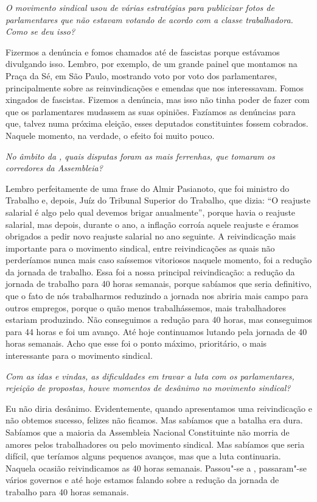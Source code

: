 \medskip

\noindent\emph{O movimento sindical usou de várias estratégias para publicizar
fotos de parlamentares que não estavam votando de acordo com a classe
trabalhadora. Como se deu isso?}

Fizermos a denúncia e fomos chamados até de
fascistas porque estávamos divulgando isso. Lembro, por exemplo, de um
grande painel que montamos na Praça da Sé, em São Paulo, mostrando voto
por voto dos parlamentares, principalmente sobre as reinvindicações e
emendas que nos interessavam. Fomos xingados de fascistas. Fizemos a
denúncia, mas isso não tinha poder de fazer com que os parlamentares
mudassem as suas opiniões. Fazíamos as denúncias para que, talvez numa
próxima eleição, esses deputados constituintes fossem cobrados. Naquele
momento, na verdade, o efeito foi muito pouco.

\medskip

\noindent\emph{No âmbito da , quais disputas foram as mais ferrenhas, que
tomaram os corredores da Assembleia?}

Lembro perfeitamente de uma frase do Almir
Pasianoto, que foi ministro do Trabalho e, depois, Juíz do Tribunal
Superior do Trabalho, que dizia: ``O reajuste salarial é algo pelo qual
devemos brigar anualmente'', porque havia o reajuste salarial, mas
depois, durante o ano, a inflação corroía aquele reajuste e éramos
obrigados a pedir novo reajuste salarial no ano seguinte. A
reivindicação mais importante para o movimento sindical, entre
reivindicações as quais não perderíamos nunca mais caso saíssemos
vitoriosos naquele momento, foi a redução da jornada de trabalho. Essa
foi a nossa principal reivindicação: a redução da jornada de trabalho
para 40 horas semanais, porque sabíamos que seria definitivo, que o fato
de nós trabalharmos reduzindo a jornada nos abriria mais campo para
outros empregos, porque o quão menos trabalhássemos, mais trabalhadores
estariam produzindo. Não conseguimos a redução para 40 horas, mas
conseguimos para 44 horas e foi um avanço. Até hoje continuamos lutando
pela jornada de 40 horas semanais. Acho que esse foi o ponto máximo,
prioritário, o mais interessante para o movimento sindical.

\medskip

\noindent\emph{Com as idas e vindas, as dificuldades em travar a luta com os
parlamentares, rejeição de propostas, houve momentos de desânimo no
movimento sindical?}

Eu não diria desânimo. Evidentemente, quando
apresentamos uma reivindicação e não obtemos sucesso, felizes não
ficamos. Mas sabíamos que a batalha era dura. Sabíamos que a maioria da
Assembleia Nacional Constituinte não morria de amores pelos
trabalhadores ou pelo movimento sindical. Mas sabíamos que seria
difícil, que teríamos alguns pequenos avanços, mas que a luta
continuaria. Naquela ocasião reivindicamos as 40 horas semanais.
Passou"-se a , passaram"-se vários governos e até hoje estamos falando
sobre a redução da jornada de trabalho para 40 horas semanais.

